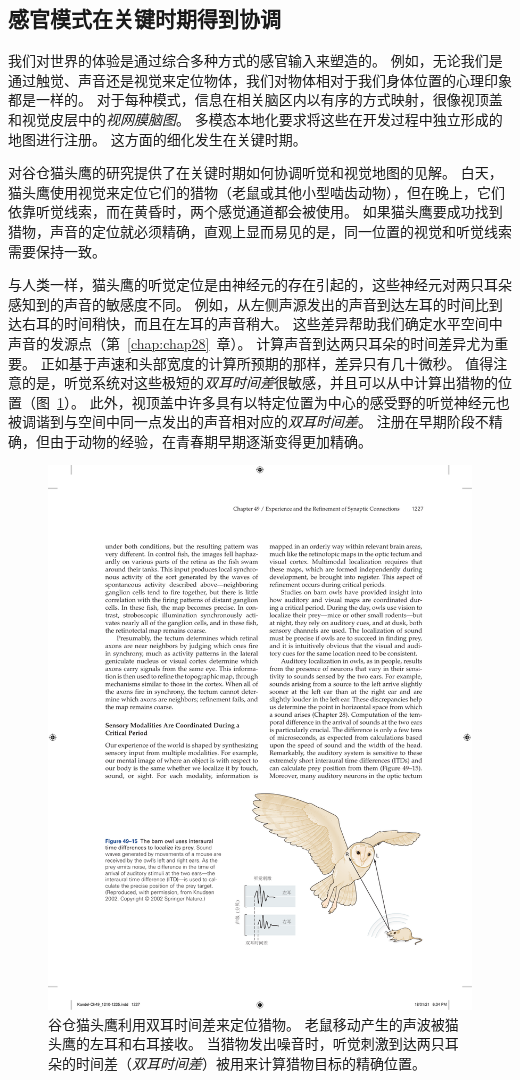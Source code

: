 \subsection{感官模式在关键时期得到协调}

我们对世界的体验是通过综合多种方式的感官输入来塑造的。
例如，无论我们是通过触觉、声音还是视觉来定位物体，我们对物体相对于我们身体位置的心理印象都是一样的。
对于每种模式，信息在相关脑区内以有序的方式映射，很像视顶盖和视觉皮层中的\textit{视网膜脑图}。
多模态本地化要求将这些在开发过程中独立形成的地图进行注册。
这方面的细化发生在关键时期。


对谷仓猫头鹰的研究提供了在关键时期如何协调听觉和视觉地图的见解。
白天，猫头鹰使用视觉来定位它们的猎物（老鼠或其他小型啮齿动物），但在晚上，它们依靠听觉线索，而在黄昏时，两个感觉通道都会被使用。
如果猫头鹰要成功找到猎物，声音的定位就必须精确，直观上显而易见的是，同一位置的视觉和听觉线索需要保持一致。


与人类一样，猫头鹰的听觉定位是由神经元的存在引起的，这些神经元对两只耳朵感知到的声音的敏感度不同。 例如，从左侧声源发出的声音到达左耳的时间比到达右耳的时间稍快，而且在左耳的声音稍大。
这些差异帮助我们确定水平空间中声音的发源点（第~\ref{chap:chap28}~章）。
计算声音到达两只耳朵的时间差异尤为重要。
正如基于声速和头部宽度的计算所预期的那样，差异只有几十微秒。
值得注意的是，听觉系统对这些极短的\textit{双耳时间差}很敏感，并且可以从中计算出猎物的位置（图~\ref{fig:49_15}）。
此外，视顶盖中许多具有以特定位置为中心的感受野的听觉神经元也被调谐到与空间中同一点发出的声音相对应的\textit{双耳时间差}。
注册在早期阶段不精确，但由于动物的经验，在青春期早期逐渐变得更加精确。


\begin{figure}[htbp]
	\centering
	\includegraphics[width=0.78\linewidth]{chap49/fig_49_15}
	\caption{谷仓猫头鹰利用双耳时间差来定位猎物。
		老鼠移动产生的声波被猫头鹰的左耳和右耳接收。
		当猎物发出噪音时，听觉刺激到达两只耳朵的时间差（\textit{双耳时间差}）被用来计算猎物目标的精确位置。}
	\label{fig:49_15}
\end{figure}



